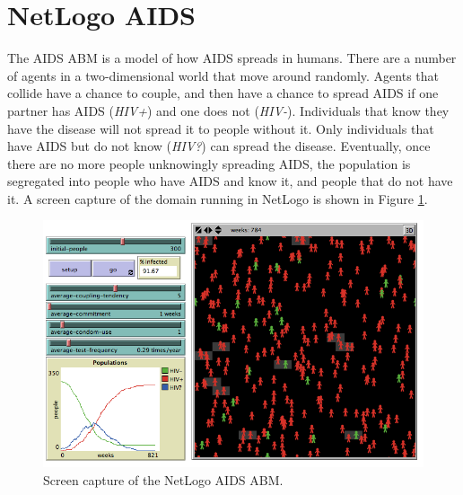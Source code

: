 
\section{NetLogo AIDS}

The AIDS ABM is a model of how AIDS spreads in humans.
There are a number of agents in a two-dimensional world that move around randomly.
Agents that collide have a chance to couple, and then have a chance to spread AIDS if one partner has AIDS (\textit{HIV+}) and one does not (\textit{HIV-}).
Individuals that know they have the disease will not spread it to people without it.
Only individuals that have AIDS but do not know (\textit{HIV?}) can spread the disease.
Eventually, once there are no more people unknowingly spreading AIDS, the population is segregated into people who have AIDS and know it, and people that do not have it.
A screen capture of the domain running in NetLogo is shown in Figure \ref{fig:aidsss}.

\begin{figure}[ht]
\centering
\includegraphics[scale=.5]{images/aids_ss.png}
\caption{Screen capture of the NetLogo AIDS ABM.}
\label{fig:aidsss}
\end{figure}

